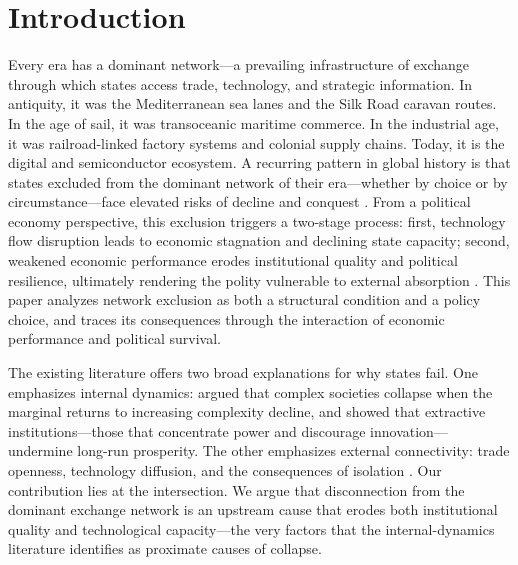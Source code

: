 \documentclass[pdflatex,sn-basic]{sn-jnl}
\theoremstyle{thmstyleone}%
\theoremstyle{thmstyletwo}%
\theoremstyle{thmstylethree}%
\begin{document}

\maketitle

\section{Introduction}\label{sec:intro}

Every era has a dominant network---a prevailing infrastructure of exchange through which states access trade, technology, and strategic information. In antiquity, it was the Mediterranean sea lanes and the Silk Road caravan routes. In the age of sail, it was transoceanic maritime commerce. In the industrial age, it was railroad-linked factory systems and colonial supply chains. Today, it is the digital and semiconductor ecosystem. A recurring pattern in global history is that states excluded from the dominant network of their era---whether by choice or by circumstance---face elevated risks of decline and conquest \citep{Kennedy1987, FindlayORourke2007}. From a political economy perspective, this exclusion triggers a two-stage process: first, technology flow disruption leads to economic stagnation and declining state capacity; second, weakened economic performance erodes institutional quality and political resilience, ultimately rendering the polity vulnerable to external absorption \citep{BesleyPersson2011, AcemogluRobinson2006}. This paper analyzes network exclusion as both a structural condition and a policy choice, and traces its consequences through the interaction of economic performance and political survival.

The existing literature offers two broad explanations for why states fail. One emphasizes internal dynamics: \citet{Tainter1988} argued that complex societies collapse when the marginal returns to increasing complexity decline, and \citet{AcemogluRobinson2012} showed that extractive institutions---those that concentrate power and discourage innovation---undermine long-run prosperity. The other emphasizes external connectivity: trade openness, technology diffusion, and the consequences of isolation \citep{FindlayORourke2007, Mokyr2002}. Our contribution lies at the intersection. We argue that disconnection from the dominant exchange network is an upstream cause that erodes both institutional quality and technological capacity---the very factors that the internal-dynamics literature identifies as proximate causes of collapse.
\end{document}
